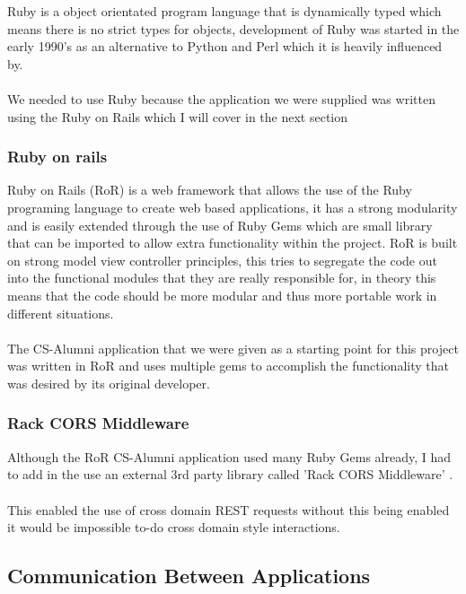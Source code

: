 \documentclass{article}
\begin{document}
Ruby is a object orientated program language that is dynamically typed which means there is no strict types for objects, development of Ruby was started in the early 1990's as an alternative to Python and Perl which it is heavily influenced by.\\
\\
We needed to use Ruby because the application we were supplied was written using the Ruby on Rails which I will cover in the next section

\subsubsection{Ruby on rails}

Ruby on Rails (RoR) is a web framework that allows the use of the Ruby programing language to create web based applications, it has a strong modularity and is easily extended through the use of Ruby Gems which are small library that can be imported to allow extra functionality within the project. RoR is built on strong model view controller principles, this tries to segregate the code out into the functional modules that they are really responsible for, in theory this means that the code should be more modular and thus more portable work in different situations.\\
\\
The CS-Alumni application that we were given as a starting point for this project was written in RoR and uses multiple gems to accomplish the functionality that was desired by its original developer.

\subsubsection{Rack CORS Middleware}

Although the RoR CS-Alumni application used many Ruby Gems already, I had to add in the use an external 3rd party library called 'Rack CORS Middleware' \cite[see reference][page \pageref{LastPage}]{cors:2014:online}.\\
\\
This enabled the use of cross domain REST requests without this being enabled it would be impossible to-do cross domain style interactions.

\subsection{Communication Between Applications}
\end{document}
